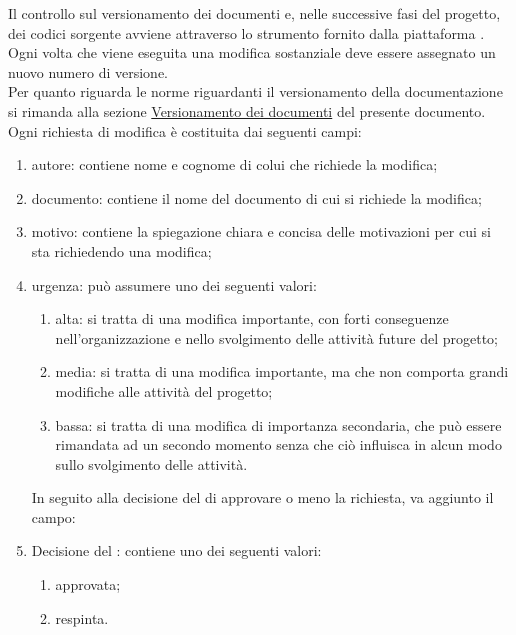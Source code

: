 				Il controllo sul versionamento dei documenti e, nelle successive fasi del progetto, dei codici sorgente avviene attraverso lo strumento fornito dalla piattaforma .\\
				Ogni volta che viene eseguita una modifica sostanziale deve essere assegnato un nuovo numero di versione.\\
				Per quanto riguarda le norme riguardanti il versionamento della documentazione si rimanda alla sezione \hyperref[sec:versioni]{Versionamento dei documenti} del presente documento.
					Ogni richiesta di modifica è costituita dai seguenti campi:
					\begin{enumerate}
						\item autore: contiene nome e cognome di colui che richiede la modifica;
						\item documento: contiene il nome del documento di cui si richiede la modifica;
						\item motivo: contiene la spiegazione chiara e concisa delle motivazioni per cui si sta richiedendo una modifica;
						\item urgenza: può assumere uno dei seguenti valori:
							\begin{enumerate}
								\item alta: si tratta di una modifica importante, con forti conseguenze nell'organizzazione e nello svolgimento delle attività future del progetto;
								\item media: si tratta di una modifica importante, ma che non comporta grandi modifiche alle attività del progetto;
								\item bassa: si tratta di una modifica di importanza secondaria, che può essere rimandata ad un secondo momento senza che ciò influisca in alcun modo sullo svolgimento delle attività.
							\end{enumerate}
					In seguito alla decisione del  di approvare o meno la richiesta, va aggiunto il campo:
						\item Decisione del : contiene uno dei seguenti valori:
							\begin{enumerate}
								\item approvata;
								\item respinta.
							\end{enumerate}
					\end{enumerate}
		
